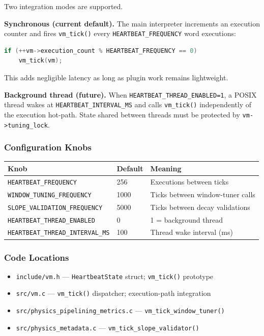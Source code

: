 Two integration modes are supported.

\textbf{Synchronous (current default).}  The main interpreter increments an
execution counter and fires \texttt{vm\_tick()} every \texttt{HEARTBEAT\_FREQUENCY}
word executions:

\begin{lstlisting}[language=C]
if (++vm->execution_count % HEARTBEAT_FREQUENCY == 0)
    vm_tick(vm);
\end{lstlisting}

This adds negligible latency as long as plugin work remains lightweight.

\textbf{Background thread (future).}  When \texttt{HEARTBEAT\_THREAD\_ENABLED=1},
a POSIX thread wakes at \texttt{HEARTBEAT\_INTERVAL\_MS} and calls
\texttt{vm\_tick()} independently of the execution hot-path.  State shared
between threads must be protected by \texttt{vm->tuning\_lock}.

\subsubsection{Configuration Knobs}

\begin{tabular}{lll}
\toprule
Knob & Default & Meaning \\
\midrule
\texttt{HEARTBEAT\_FREQUENCY}        & 256   & Executions between ticks \\
\texttt{WINDOW\_TUNING\_FREQUENCY}   & 1000  & Ticks between window-tuner calls \\
\texttt{SLOPE\_VALIDATION\_FREQUENCY}& 5000  & Ticks between decay validations \\
\texttt{HEARTBEAT\_THREAD\_ENABLED}  & 0     & 1 = background thread \\
\texttt{HEARTBEAT\_THREAD\_INTERVAL\_MS} & 100 & Thread wake interval (ms) \\
\bottomrule
\end{tabular}

\subsubsection{Code Locations}

\begin{itemize}
  \item \texttt{include/vm.h} --- \texttt{HeartbeatState} struct; \texttt{vm\_tick()} prototype
  \item \texttt{src/vm.c} --- \texttt{vm\_tick()} dispatcher; execution-path integration
  \item \texttt{src/physics\_pipelining\_metrics.c} --- \texttt{vm\_tick\_window\_tuner()}
  \item \texttt{src/physics\_metadata.c} --- \texttt{vm\_tick\_slope\_validator()}
\end{itemize}
